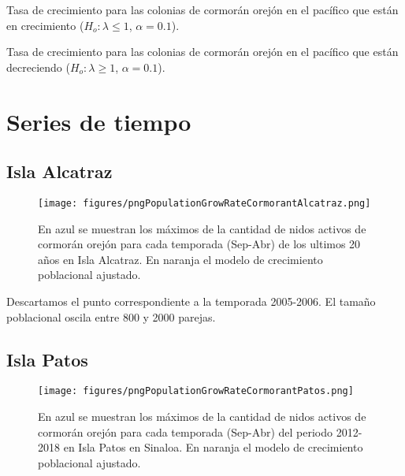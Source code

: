 \documentclass{article} %
\begin{document}
\begin{table}[H]
\centering
\caption{Tasa de crecimiento para las colonias de cormorán orejón en el pacífico que están en crecimiento ($H_o: \lambda\leq 1$, $\alpha = 0.1$).}
\label{tab:csvPobAumentando}
\end{table}


\begin{table}[H]
\centering
\caption{Tasa de crecimiento para las colonias de cormorán orejón en el pacífico que están decreciendo ($H_o: \lambda\geq 1$, $\alpha = 0.1$).}
\label{tab:csvPobDisminuyendo}
\end{table}


\section*{Series de tiempo}

\subsection*{Isla Alcatraz}

\begin{figure}[H]
\hspace{-2cm}
    \texttt{[image: figures/pngPopulationGrowRateCormorantAlcatraz.png]}
\caption{En azul se muestran los máximos de la cantidad de nidos activos de cormorán orejón para cada temporada (Sep-Abr) de los ultimos 20 años en Isla Alcatraz. En naranja el modelo de crecimiento poblacional ajustado.}
\end{figure}

Descartamos el punto correspondiente a la temporada 2005-2006. El tamaño poblacional oscila entre 800 y 2000 parejas. 

\subsection*{Isla Patos}

\begin{figure}[H]
\hspace{-2cm}
    \texttt{[image: figures/pngPopulationGrowRateCormorantPatos.png]}
\caption{En azul se muestran los máximos de la cantidad de nidos activos de cormorán orejón para cada temporada (Sep-Abr) del periodo 2012-2018 en Isla Patos en Sinaloa. En naranja el modelo de crecimiento poblacional ajustado.}
\end{figure}
\end{document}
